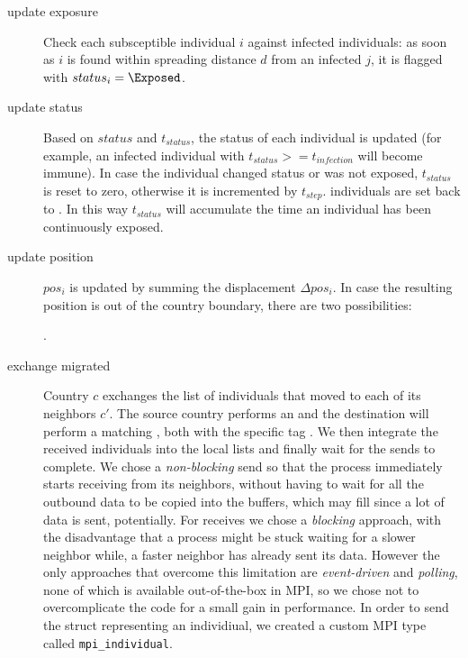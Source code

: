 \begin{description}
    \item[update exposure] Check each subsceptible individual $i$ against infected individuals: as soon as $i$ is found within spreading distance $d$ from an infected $j$, it is flagged with $status_i = \Exposed$.

    \item[update status] Based on $status$ and $t_{status}$, the status of each individual is updated (for example, an infected individual with $t_{status} >= t_{infection}$ will become immune). In case the individual changed status or was not exposed, $t_{status}$ is reset to zero, otherwise it is incremented by $t_{step}$. \Exposed individuals are set back to \NotExposed. In this way $t_{status}$ will accumulate the time an individual has been continuously exposed.
     
    \item[update position] $pos_i$ is updated by summing the displacement $\Delta pos_i$. In case the resulting position is out of the country boundary, there are two possibilities:
    .

    \item[exchange migrated] Country $c$ exchanges the list of individuals that moved to each of its neighbors $c'$. The source country performs an \MPIIsend and the destination will perform a matching \MPIRecv , both with the specific tag \MigratedTag.
    We then integrate the received individuals into the local lists and finally wait for the sends to complete.
    We chose a \emph{non-blocking} send so that the process immediately starts receiving from its neighbors, without having to wait for all the outbound data to be copied into the buffers, which may fill since a lot of data is sent, potentially. For receives we chose a \emph{blocking} approach, with the disadvantage that a process might be stuck waiting for a slower neighbor while, a faster neighbor has already sent its data. However the only approaches that overcome this limitation are \emph{event-driven} and \emph{polling}, none of which is available out-of-the-box in MPI, so we chose not to overcomplicate the code for a small gain in performance.
    In order to send the struct representing an individiual, we created a custom MPI type called \texttt{mpi\_individual}.


\end{description}
